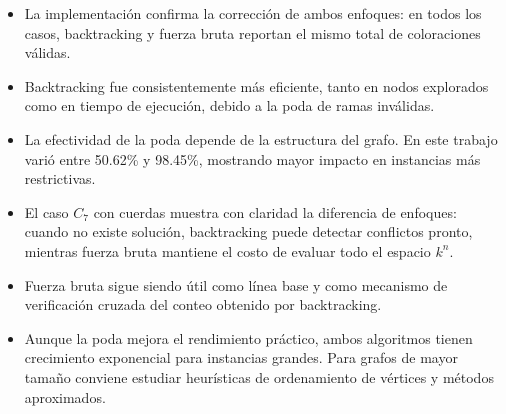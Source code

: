 \documentclass[12pt,a4paper]{article}
\begin{document}
\begin{itemize}
  \item La implementación confirma la corrección de ambos enfoques: en todos
  los casos, backtracking y fuerza bruta reportan el mismo total de
  coloraciones válidas.

  \item Backtracking fue consistentemente más eficiente, tanto en nodos
  explorados como en tiempo de ejecución, debido a la poda de ramas inválidas.

  \item La efectividad de la poda depende de la estructura del grafo. En este
  trabajo varió entre 50.62\% y 98.45\%, mostrando mayor impacto en instancias
  más restrictivas.

  \item El caso \(C_7\) con cuerdas muestra con claridad la diferencia de
  enfoques: cuando no existe solución, backtracking puede detectar conflictos
  pronto, mientras fuerza bruta mantiene el costo de evaluar todo el espacio
  \(k^n\).

  \item Fuerza bruta sigue siendo útil como línea base y como mecanismo de
  verificación cruzada del conteo obtenido por backtracking.

  \item Aunque la poda mejora el rendimiento práctico, ambos algoritmos tienen
  crecimiento exponencial para instancias grandes. Para grafos de mayor tamaño
  conviene estudiar heurísticas de ordenamiento de vértices y métodos
  aproximados.
\end{itemize}
\end{document}
